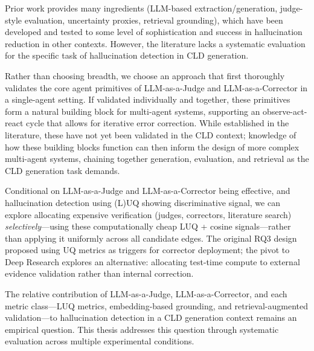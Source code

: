 Prior work provides many ingredients (LLM-based extraction/generation, judge-style evaluation, uncertainty proxies, retrieval grounding), which have been developed and tested to some level of sophistication and success in hallucination reduction in other contexts. However, the literature lacks a systematic evaluation for the specific task of hallucination detection in CLD generation.

Rather than choosing breadth, we choose an approach that first thoroughly validates the core agent primitives of LLM-as-a-Judge and LLM-as-a-Corrector in a single-agent setting. If validated individually and together, these primitives form a natural building block for multi-agent systems, supporting an observe-act-react cycle that allows for iterative error correction. While established in the literature, these have not yet been validated in the CLD context; knowledge of how these building blocks function can then inform the design of more complex multi-agent systems, chaining together generation, evaluation, and retrieval as the CLD generation task demands.

Conditional on LLM-as-a-Judge and LLM-as-a-Corrector being effective, and hallucination detection using (L)UQ showing discriminative signal, we can explore allocating expensive verification (judges, correctors, literature search) \emph{selectively}---using these computationally cheap LUQ + cosine signals---rather than applying it uniformly across all candidate edges. The original RQ3 design proposed using UQ metrics as triggers for corrector deployment; the pivot to Deep Research explores an alternative: allocating test-time compute to external evidence validation rather than internal correction.

The relative contribution of LLM-as-a-Judge, LLM-as-a-Corrector, and each metric class---LUQ metrics, embedding-based grounding, and retrieval-augmented validation---to hallucination detection in a CLD generation context remains an empirical question. This thesis addresses this question through systematic evaluation across multiple experimental conditions.